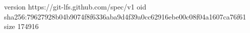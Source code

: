 version https://git-lfs.github.com/spec/v1
oid sha256:79627928b04b9074f8f6336aba9d4f39a0cc62916ebe00c08f04a1607ca76f61
size 174916
